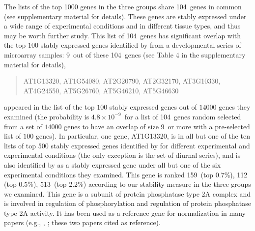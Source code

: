 \documentclass[letterpaper,12pt]{article}
\newcommand{\overlapGene}{104~}
\newcommand{\overlapGeneCze}{9~}
\newcommand{\overlapProb}{$4.8\times 10^{-9}$~}
\newcommand{\rankInSeedling}{159~}
\newcommand{\rankInLeaf}{112~}
\newcommand{\rankInTissue}{513~}
\newcommand{\rankTopPctSeedling}{0.7\%}
\newcommand{\rankTopPctLeaf}{0.5\%}
\newcommand{\rankTopPctTissue}{2.2\%}
\begin{document}

The lists of the top 1000 genes in the three groups share \overlapGene genes in common (see supplementary material for details).  These
genes are stably expressed under a wide range of experimental conditions and
in different tissue types, and thus may be worth further study. This list of
\overlapGene genes has significant overlap with the top $100$ stably expressed genes
identified by \cite{czechowski2005genome} from a developmental series of
microarray samples: \overlapGeneCze out of these \overlapGene genes (see Table 4 in the
supplementary material for details),
\begin{center}
\begin{quote}
AT1G13320, AT1G54080, AT2G20790, AT2G32170, AT3G10330,\\
 AT4G24550, AT5G26760, AT5G46210, AT5G46630 \\
\end{quote}
\end{center}
appeared in the list of the top $100$ stably expressed genes
out of $14000$ genes they examined (the probability is \overlapProb for
a list of \overlapGene genes random selected from a set of $14000$ genes to have an
overlap of size \overlapGeneCze or more with a pre-selected list of $100$ genes). In
particular, one gene, AT1G13320, is in all but one of the ten lists of top 500 stably
expressed genes identified by \cite{czechowski2005genome} for different
experimental and experimental conditions (the only exception is the set of
diurnal series), and is also identified by
\cite{hong2010identification} as a stably expressed gene under all but one of the six
experimental conditions they examined.  This gene is ranked \rankInSeedling (top \rankTopPctSeedling), \rankInLeaf
(top \rankTopPctLeaf), \rankInTissue (top \rankTopPctTissue) according to our stability measure in the three
groups we examined.
This gene is a subunit of protein phosphatase type 2A complex and is involved in
regulation of phosphorylation and regulation of protein phosphatase type 2A
activity. It has been used as a reference gene for normalization in many
papers (e.g., \cite{bournier2013arabidopsis}, \cite{baron2012transcriptional};
these two papers cited \cite{czechowski2005genome} as reference). 
\end{document}
